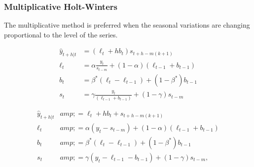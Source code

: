\documentclass{article}
\begin{document}
\subsubsection{Multiplicative Holt-Winters} 
The multiplicative method is preferred when the seasonal variations are changing proportional to the level of the series. 

\begin{align*}
  \hat{y}_{t+h|t} & = (\ell_{t} + hb_{t})s_{t+h-m(k+1)} \\
  \ell_{t} & = \alpha \frac{y_{t}}{s_{t-m}} + (1 - \alpha)(\ell_{t-1} + b_{t-1})\\
  b_{t} & = \beta^*(\ell_{t}-\ell_{t-1}) + (1 - \beta^*)b_{t-1}                \\
  s_{t} & = \gamma \frac{y_{t}}{(\ell_{t-1} + b_{t-1})} + (1 - \gamma)s_{t-m}
\end{align*}


\begin{align*}
  \hat{y}_{t+h|t} &amp;= \ell_{t} + hb_{t} + s_{t+h-m(k+1)} \\
  \ell_{t} &amp;= \alpha(y_{t} - s_{t-m}) + (1 - \alpha)(\ell_{t-1} + b_{t-1})\\
  b_{t} &amp;= \beta^*(\ell_{t} - \ell_{t-1}) + (1 - \beta^*)b_{t-1}\\
  s_{t} &amp;= \gamma (y_{t}-\ell_{t-1}-b_{t-1}) + (1-\gamma)s_{t-m},
\end{align*}
\end{document}
